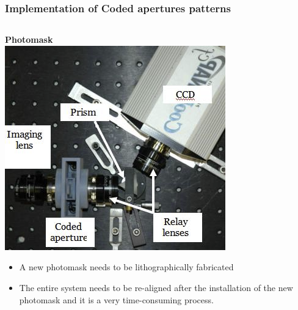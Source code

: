 \documentclass{beamer}
\begin{document}

\begin{frame}
\frametitle{Implementation of Coded apertures patterns}

\begin{columns}

\begin{column}{2.5in}
\begin{center}

\textbf{Photomask}\\
\vspace{10pt}
\includegraphics[scale=0.25]{FiguresUpd/photomask.png}
\end{center}

\begin{itemize}
\item \small A new photomask needs to be lithographically fabricated
\item \small The entire system needs to be re-aligned after the installation of the new photomask and it is a very time-consuming process. 
\end{itemize}

\end{column}


\end{columns}
\end{frame}
\end{document}
